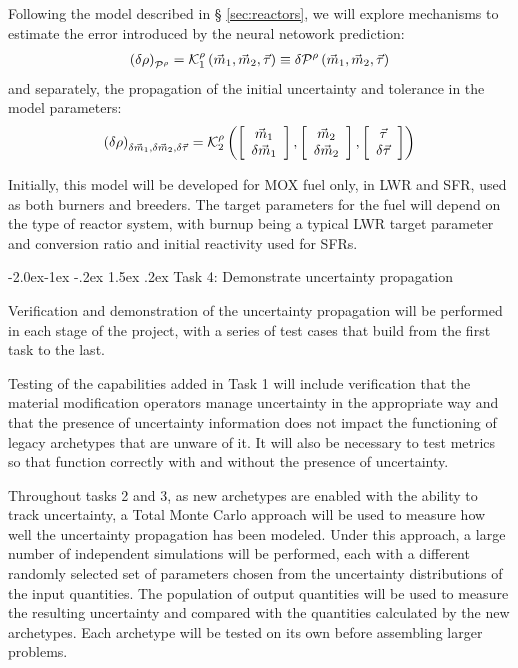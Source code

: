 \documentclass[dvips,11pt]{article}
\makeatletter
\newcommand{\unc}[1]
{ \delta #1 }
\newcommand{\uncvector}[1]
{ \left[ \begin{array}{c} #1 \\ \delta #1 \end{array} \right] }
\renewcommand\subsection{\@startsection{subsection}{2}{\z@}%
                                     {-2.0ex\@plus -1ex \@minus -.2ex}%
                                     {1.5ex \@plus .2ex}%
                                     {\normalfont\bfseries}}%
\makeatother
\begin{document}
Following the model described in \S
\ref{sec:reactors}, we will explore mechanisms to
estimate the error introduced by the neural
netowork prediction:
\begin{align}
  \left(\unc{\rho}\right)_{\cal P^\rho} = {\cal K}_1^{\rho}\left( \vec{m}_{1},\vec{m}_{2}, \vec{\tau} \right) \equiv \delta {\cal P}^\rho\left( \vec{m}_{1},\vec{m}_{2}, \vec{\tau} \right)
\end{align}
and separately, the propagation of the initial uncertainty and tolerance in the model parameters:
\begin{align}
  \left(\unc{\rho}\right)_{\unc{\vec{m}_{1}},\unc{\vec{m}_{2}},\unc{\vec{\tau}}} = {\cal K}^{\rho}_2\left( \uncvector{\vec{m}_{1}},\uncvector{\vec{m}_{2}}, \uncvector{\vec{\tau}} \right)
\end{align}

Initially, this model will be developed for MOX
fuel only, in LWR and SFR, used as both burners
and breeders.  The target parameters for the fuel
will depend on the type of reactor system, with
burnup being a typical LWR target parameter and
conversion ratio and initial reactivity used for
SFRs.

\subsection{Task 4: Demonstrate uncertainty propagation}

Verification and demonstration of the uncertainty
propagation will be performed in each stage of the
project, with a series of test cases that build
from the first task to the last.

Testing of the capabilities added in Task 1 will
include verification that the material
modification operators manage uncertainty in the
appropriate way and that the presence of
uncertainty information does not impact the
functioning of legacy archetypes that are unware
of it.  It will also be necessary to test metrics
so that function correctly with and without the
presence of uncertainty.

Throughout tasks 2 and 3, as new archetypes are
enabled with the ability to track uncertainty, a
Total Monte Carlo approach will be used to measure
how well the uncertainty propagation has been
modeled.  Under this approach, a large number of
independent simulations will be performed, each
with a different randomly selected set of
parameters chosen from the uncertainty
distributions of the input quantities.  The
population of output quantities will be used to
measure the resulting uncertainty and compared
with the quantities calculated by the new
archetypes.  Each archetype will be tested on its
own before assembling larger problems.
\end{document}
